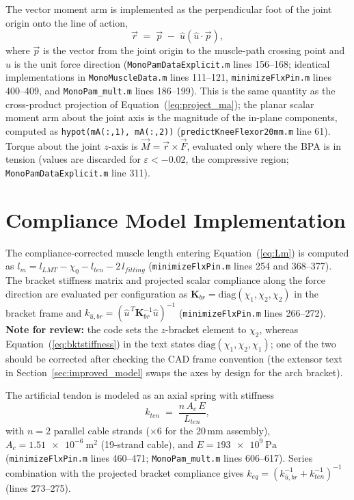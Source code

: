 The vector moment arm is implemented as the perpendicular foot of the joint origin onto the line of action,
\begin{equation}
    \vec{r} \;=\; \vec{p} \;-\; \hat{u}\left(\hat{u}\cdot\vec{p}\right),
    \label{eq:app_perpfoot}
\end{equation}
where $\vec{p}$ is the vector from the joint origin to the muscle-path crossing point and $\hat{u}$ is the unit force direction (\texttt{MonoPamDataExplicit.m} lines 156--168; identical implementations in \texttt{MonoMuscleData.m} lines 111--121, \texttt{minimizeFlxPin.m} lines 400--409, and \texttt{MonoPam\_mult.m} lines 186--199). This is the same quantity as the cross-product projection of Equation~(\ref{eq:project_ma}); the planar scalar moment arm about the joint axis is the magnitude of the in-plane components, computed as \texttt{hypot(mA(:,1), mA(:,2))} (\texttt{predictKneeFlexor20mm.m} line 61). Torque about the joint $z$-axis is $\vec{M} = \vec{r}\times\vec{F}$, evaluated only where the BPA is in tension (values are discarded for $\varepsilon < -0.02$, the compressive region; \texttt{MonoPamDataExplicit.m} line 311).

\section{Compliance Model Implementation}

The compliance-corrected muscle length entering Equation~(\ref{eq:Lm}) is computed as $l_{m} = l_{LMT} - \chi_{0} - l_{ten} - 2\,l_{fitting}$ (\texttt{minimizeFlxPin.m} lines 254 and 368--377). The bracket stiffness matrix and projected scalar compliance along the force direction are evaluated per configuration as $\mathbf{K}_{br} = \mathrm{diag}(\chi_{1},\chi_{2},\chi_{2})$ in the bracket frame and $k_{\hat{u},br} = \left(\hat{u}^{\,T}\mathbf{K}_{br}^{-1}\hat{u}\right)^{-1}$ (\texttt{minimizeFlxPin.m} lines 266--272). \textbf{Note for review:} the code sets the $z$-bracket element to $\chi_{2}$, whereas Equation~(\ref{eq:bktstiffness}) in the text states $\mathrm{diag}(\chi_{1},\chi_{2},\chi_{1})$; one of the two should be corrected after checking the CAD frame convention (the extensor text in Section~\ref{sec:improved_model} swaps the axes by design for the arch bracket).

The artificial tendon is modeled as an axial spring with stiffness
\begin{equation}
    k_{ten} \;=\; \frac{n\,A_{c}\,E}{L_{ten}},
    \label{eq:app_tendon}
\end{equation}
with $n=2$ parallel cable strands ($\times 6$ for the 20\,mm assembly), $A_{c} = \qty{1.51e-6}{\metre\squared}$ (19-strand cable), and $E = \qty{193e9}{\pascal}$ (\texttt{minimizeFlxPin.m} lines 460--471; \texttt{MonoPam\_mult.m} lines 606--617). Series combination with the projected bracket compliance gives $k_{eq} = \left(k_{\hat{u},br}^{-1} + k_{ten}^{-1}\right)^{-1}$ (lines 273--275).

